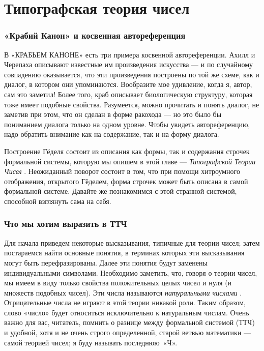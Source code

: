 \documentclass[../main.tex]{subfiles}
\begin{document}
\chapter{Типографская теория чисел}

\subsection{«Крабий Канон» и косвенная автореференция}

В «КРАБЬЕМ КАНОНЕ» есть три примера косвенной автореференции. Ахилл и Черепаха описывают известные им произведения искусства --- и по случайному совпадению оказывается, что эти произведения построены по той же схеме, как и диалог, в котором они упоминаются. Вообразите мое удивление, когда я, автор, сам это заметил! Более того, краб описывает биологическую структуру, которая тоже имеет подобные свойства. Разумеется, можно прочитать и понять диалог, не заметив при этом, что он сделан в форме ракохода --- но это было бы пониманием диалога только на одном уровне. Чтобы увидеть автореференцию, надо обратить внимание как на содержание, так и на форму диалога.

Построение Гёделя состоит из описания как формы, так и содержания строчек формальной системы, которую мы опишем в этой главе --- \emph{Типографской Теории Чисел} . Неожиданный поворот состоит в том, что при помощи хитроумного отображения, открытого Гёделем, форма строчек может быть описана в самой формальной системе. Давайте же познакомимся с этой странной системой, способной взглянуть сама на себя.


\subsection{Что мы хотим выразить в ТТЧ}

Для начала приведем некоторые высказывания, типичные для теории чисел; затем постараемся найти основные понятия, в терминах которых эти высказывания могут быть перефразированы. Далее эти понятия будут заменены индивидуальными символами. Необходимо заметить, что, говоря о теории чисел, мы имеем в виду только свойства положительных целых чисел и нуля (и множеств подобных чисел). Эти числа называются \emph{натуральными числами} . Отрицательные числа не играют в этой теории никакой роли. Таким образом, слово «число» будет относиться исключительно к натуральным числам. Очень важно для вас, читатель, помнить о разнице между формальной системой (ТТЧ) и удобной, хотя и не очень строго определенной, старой ветвью математики --- самой теорией чисел; я буду называть последнюю~«Ч».
\end{document}
